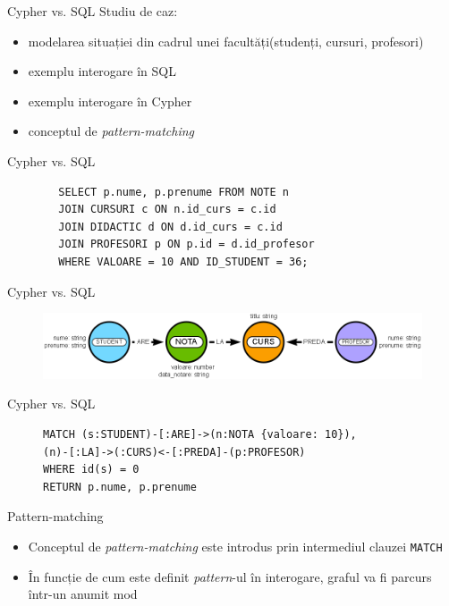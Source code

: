 \documentclass{beamer}
\begin{document}
\begin{frame}{Cypher vs. SQL}
    Studiu de caz:
    \begin{itemize}
        \item modelarea situației din cadrul unei facultăți(studenți, cursuri, profesori)
        \item exemplu interogare în SQL
        \item exemplu interogare în Cypher
        \item conceptul de \emph{pattern-matching}
    \end{itemize}
\end{frame}


\begin{frame}[fragile]{Cypher vs. SQL}
    \centering
    \begin{BVerbatim}
        SELECT p.nume, p.prenume FROM NOTE n 
        JOIN CURSURI c ON n.id_curs = c.id
        JOIN DIDACTIC d ON d.id_curs = c.id
        JOIN PROFESORI p ON p.id = d.id_profesor
        WHERE VALOARE = 10 AND ID_STUDENT = 36;
    \end{BVerbatim}
\end{frame}

\begin{frame}[fragile]{Cypher vs. SQL}
    \begin{figure}[H]
        \centering
        \begin{adjustbox}{max size={\textwidth}{\textheight}}
        \includegraphics[scale = 0.4]{exemplu_2}
        \end{adjustbox}
    \end{figure}
\end{frame}

\begin{frame}[fragile]{Cypher vs. SQL}
    \centering
    \begin{figure}[H]
\centering
\begin{BVerbatim}
MATCH (s:STUDENT)-[:ARE]->(n:NOTA {valoare: 10}),
(n)-[:LA]->(:CURS)<-[:PREDA]-(p:PROFESOR)
WHERE id(s) = 0
RETURN p.nume, p.prenume
\end{BVerbatim}
\end{figure}
\end{frame}

\begin{frame}{Pattern-matching}
    
\begin{itemize}
    \item Conceptul de \emph{pattern-matching} este introdus prin intermediul clauzei \texttt{MATCH}
    \item În funcție de cum este definit \emph{pattern}-ul în interogare, graful va fi parcurs într-un anumit mod
\end{itemize}

\end{frame}
\end{document}
